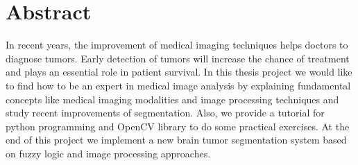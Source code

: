 \chapter{Abstract}
\label{sec:abstract}
\let\cleardoublepage\clearpage


\vspace{3cm}

\begin{adjustwidth}{70pt}{70pt}
In recent years, the improvement of medical imaging techniques helps doctors to diagnose tumors. Early detection of tumors will increase the chance of treatment and plays an essential role in patient survival. In this thesis project we would like to find how to be an expert in medical image analysis by explaining fundamental concepts like medical imaging modalities and image processing techniques and study recent improvements of segmentation. Also, we provide a tutorial for python programming and OpenCV library to do some practical exercises. At the end of this project we implement a new brain tumor segmentation system based on fuzzy logic and image processing approaches. 

\end{adjustwidth}
